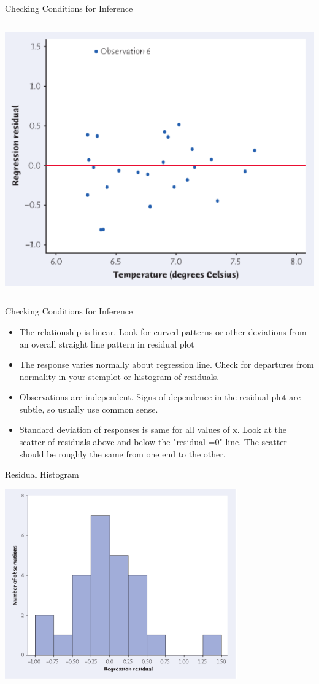 \documentclass{beamer}
\begin{document}
\begin{frame}{Checking Conditions for Inference}
\begin{columns}
		\includegraphics[width=\textwidth]{resid}
	\end{columns}
\end{frame}

\begin{frame}{Checking Conditions for Inference}
	\begin{itemize}
		\item \alert{The relationship is linear}. Look for curved patterns or other deviations from an overall straight line pattern in residual plot
		\item \alert{The response varies normally about regression line}. Check for departures from normality in your stemplot or histogram of residuals.
		\item \alert{Observations are independent}. Signs of dependence in the residual plot are subtle, so usually use common sense. 
		\item \alert{Standard deviation of responses is same for all values of x}. Look at the scatter of residuals above and below the "residual =0" line. The scatter should be roughly the same from one end to the other. 
	\end{itemize}
\end{frame}

\begin{frame}{Residual Histogram}
	\begin{center}
		\includegraphics[width=0.75\textwidth]{residual_histo}
	\end{center}
\end{frame}
\end{document}
